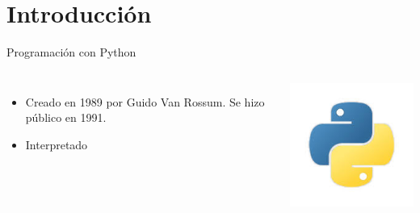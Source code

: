 
\section{Introducción}
\label{sec:intro}

\begin{frame}{Programación con Python}
  \begin{columns}
    \begin{itemize} \justifying
    \item Creado en 1989 por Guido Van Rossum. Se hizo público en 1991.
    \item Interpretado
    \end{itemize}
    
    \includegraphics[scale=0.6]{figs/fig_01_python-logo}
  \end{columns}
\end{frame}





